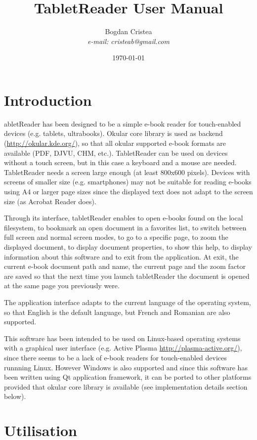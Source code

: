\documentclass[journal,12pt]{IEEEtran}
\title{TabletReader User Manual}
\author{Bogdan Cristea\\\textit{e-mail: cristeab@gmail.com}}
\date{\today}
\begin{document}
\maketitle

\section{Introduction}

abletReader has been designed to be a simple e-book reader for touch-enabled devices (e.g. tablets, ultrabooks). Okular core library is used as backend (\url{http://okular.kde.org/}), so that all okular supported e-book formats are available (PDF, DJVU, CHM, etc.). TabletReader can be used on devices without a touch screen, but in this case a keyboard and a mouse are needed. TabletReader needs a screen large enough (at least 800x600 pixels). Devices with screens of smaller size (e.g. smartphones) may not be suitable for reading e-books using A4 or larger page sizes since the displayed text does not adapt to the screen size (as Acrobat Reader does).

Through its interface, tabletReader enables to open e-books found on the local filesystem, to bookmark an open document in a favorites list, to switch between full screen and normal screen modes, to go to a specific page, to zoom the displayed document, to display document properties, to show this help, to display information about this software and to exit from the application. At exit, the current e-book document path and name, the current page and the zoom factor are saved so that the next time you launch tabletReader the document is opened at the same page you previously were. 

The application interface adapts to the current language of the operating system, so that English is the default language, but French and Romanian are also supported.

This software has been intended to be used on Linux-based operating systems with a graphical user interface (e.g. Active Plasma \url{http://plasma-active.org/}), since there seems to be a lack of e-book readers for touch-enabled devices runnning Linux. However Windows is also supported and since this software has been written using Qt application framework, it can be ported to other platforms provided that okular core library is available (see implementation details section below).

\newpage

\section{Utilisation}
\end{document}
